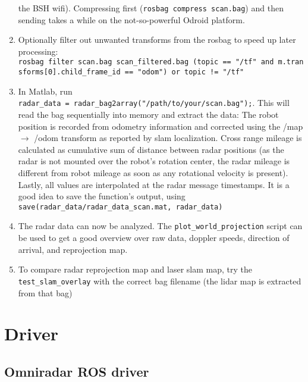 \begin{enumerate}
  the BSH wifi). Compressing first (\texttt{rosbag\ compress\ scan.bag})
  and then sending takes a while on the not-so-powerful Odroid platform.
\item
  Optionally filter out unwanted transforms from the rosbag to speed up
  later processing:
  \texttt{rosbag\ filter\ scan.bag\ scan\_filtered.bag\ \textquotesingle{}(topic\ ==\ "/tf"\ and\ m.transforms{[}0{]}.child\_frame\_id\ ==\ "odom")\ or\ topic\ !=\ "/tf"\textquotesingle{}}
\item
  In Matlab, run
  \texttt{radar\_data\ =\ radar\_bag2array("/path/to/your/scan.bag");}.
  This will read the bag sequentially into memory and extract the data:
  The robot position is recorded from odometry information and corrected
  using the /map \(\rightarrow\) /odom transform as reported by slam
  localization. Cross range mileage is calculated as cumulative sum of
  distance between radar positions (as the radar is not mounted over the
  robot's rotation center, the radar mileage is different from robot
  mileage as soon as any rotational velocity is present). Lastly, all
  values are interpolated at the radar message timestamps. It is a good
  idea to save the function's output, using
  \texttt{save(\textquotesingle{}radar\_data/radar\_data\_scan.mat\textquotesingle{},\ \textquotesingle{}radar\_data\textquotesingle{})}
\item
  The radar data can now be analyzed. The
  \texttt{plot\_world\_projection} script can be used to get a good
  overview over raw data, doppler speeds, direction of arrival, and
  reprojection map.
\item
  To compare radar reprojection map and laser slam map, try the
  \texttt{test\_slam\_overlay} with the correct bag filename (the lidar
  map is extracted from that bag)
\end{enumerate}


\section{Driver}\label{driver}

\subsection{Omniradar ROS driver}\label{omniradar-ros-driver}

